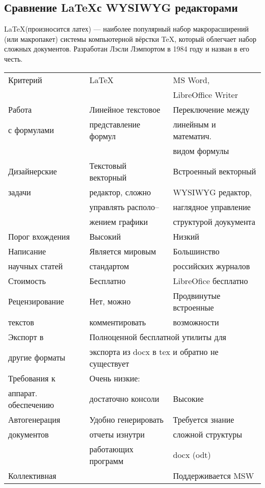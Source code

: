 \subsection{Сравнение \LaTeX с WYSIWYG редакторами}
\LaTeX (произносится латех) — наиболее популярный набор макрорасширений (или макропакет) системы компьютерной вёрстки \TeX, который облегчает набор сложных документов. Разработан Лэсли Лэмпортом в 1984 году и назван в его честь.
\begin{table}
\begin{tabular}{|l|l|l|}
\hline
Критерий & \LaTeX & MS Word, \\
 & & LibreOffice Writer \\
\hline
 Работа& Линейное текстовое & Переключение между \\
с формулами &  представление формул & линейным и математич.  \\
 &  &  видом формулы \\
\hline
 Дизайнерские& Текстовый векторный & Встроенный векторный \\
 задачи& редактор, сложно&  WYSIWYG редактор, \\
&  управлять располо--& наглядное управление \\
&жением графики & структурой доукумента \\
\hline
Порог вхождения& Высокий& Низкий \\
\hline
Написание& Является мировым& Большинство  \\
научных статей& стандартом& российских журналов \\
\hline
Стоимость&Бесплатно&LibreOfice бесплатно \\
\hline
Рецензирование&Нет, можно&Продвинутые встроенные \\
текстов& комментировать &возможности \\
\hline
Экспорт в &\multicolumn{2}{l|}{Полноценной бесплатной утилиты для } \\
 другие форматы& \multicolumn{2}{l|}{экспорта из docx в tex и обратно не существует} \\
\hline
Требования к& Очень низкие:& \\
аппарат. обеспечению& достаточно консоли & Высокие\\
\hline
Автогенерация&Удобно генерировать& Требуется знание\\
документов&отчеты изнутри&  сложной структуры \\
 &работающих программ&  docx (odt) \\
\hline
Коллективная& &Поддерживается MSW\\

\end{tabular}
\end{table}

